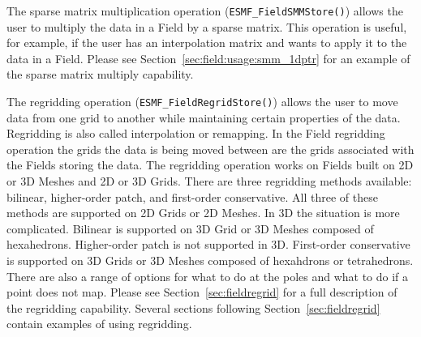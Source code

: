 The sparse matrix multiplication operation ({\tt ESMF\_FieldSMMStore()}) allows the user to multiply the data in a Field by a sparse matrix. This operation is useful, for example, if the user has an interpolation matrix and wants to apply it to the data in a Field. Please see Section~\ref{sec:field:usage:smm_1dptr}
for an example of the sparse matrix multiply capability.

The regridding operation ({\tt ESMF\_FieldRegridStore()}) allows the user to move data from one grid to another while maintaining certain properties
of the data. Regridding is also called interpolation or remapping. In the Field regridding operation the grids the data is being moved between
are the grids associated with the Fields storing the data. The regridding operation works on Fields built on 2D or 3D Meshes and 2D or 3D Grids. 
There are three regridding methods available: bilinear, higher-order patch, and first-order conservative. All three of these methods are 
supported on 2D Grids or 2D Meshes. In 3D the situation is more complicated. Bilinear 
is supported on 3D Grid or 3D Meshes composed of hexahedrons. Higher-order patch is not supported in 3D. First-order conservative 
is supported on 3D Grids or 3D Meshes composed of hexahdrons or tetrahedrons. There are also a range of options for what to do at the poles and what to do 
if a point does not map. Please see Section~\ref{sec:fieldregrid} for a full description of the regridding capability. Several sections following Section~\ref{sec:fieldregrid} 
contain examples of using regridding. 







